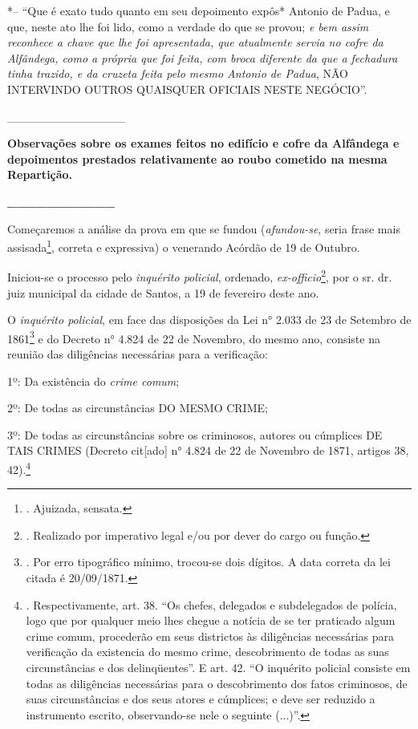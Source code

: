 *-- ``Que é exato tudo quanto em seu depoimento expôs* Antonio de Padua,
e que, neste ato lhe foi lido, como a verdade do que se provou; \emph{e
bem assim reconhece a chave que lhe foi apresentada, que atualmente
servia no cofre da Alfândega, como a própria que foi feita, com broca
diferente da que a fechadura tinha trazido, e da cruzeta feita pelo
mesmo Antonio de Padua}, NÃO INTERVINDO OUTROS QUAISQUER OFICIAIS NESTE
NEGÓCIO''.

\_\_\_\_\_\_\_\_\_\_\_\_\_\_

\textbf{Observações sobre os exames feitos no edifício e cofre da
Alfândega e depoimentos prestados relativamente ao roubo cometido na
mesma Repartição.}

\textbf{\_\_\_\_\_\_\_\_\_\_\_}

Começaremos a análise da prova em que se fundou (\emph{afundou-se},
seria frase mais assisada\footnote{. Ajuizada, sensata.}, correta e
expressiva) o venerando Acórdão de 19 de Outubro.

Iniciou-se o processo pelo \emph{inquérito policial}, ordenado,
\emph{ex-officio}\footnote{. Realizado por imperativo legal e/ou por
  dever do cargo ou função.}, por o sr. dr. juiz municipal da cidade de
Santos, a 19 de fevereiro deste ano.

O \emph{inquérito policial}, em face das disposições da Lei n° 2.033 de
23 de Setembro de 1861\footnote{. Por erro tipográfico mínimo, trocou-se
  dois dígitos. A data correta da lei citada é 20/09/1871.} e do Decreto
n° 4.824 de 22 de Novembro, do mesmo ano, consiste na reunião das
diligências necessárias para a verificação:

1º: Da existência do \emph{crime comum};

2º: De todas as circunstâncias DO MESMO CRIME;

3º: De todas as circunstâncias sobre os criminosos, autores ou cúmplices
DE TAIS CRIMES (Decreto cit{[}ado{]} n° 4.824 de 22 de Novembro de 1871,
artigos 38, 42).\footnote{. Respectivamente, art. 38. ``Os chefes,
  delegados e subdelegados de polícia, logo que por qualquer meio lhes
  chegue a notícia de se ter praticado algum crime comum, procederão em
  seus districtos às diligências necessárias para verificação da
  existencia do mesmo crime, descobrimento de todas as suas
  circunstâncias e dos delinqüentes''. E art. 42. ``O inquérito policial
  consiste em todas as diligências necessárias para o descobrimento dos
  fatos criminosos, de suas circunstâncias e dos seus atores e
  cúmplices; e deve ser reduzido a instrumento escrito, observando-se
  nele o seguinte (...)''.}

